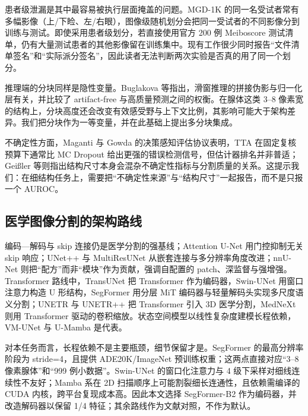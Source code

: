 患者级泄漏是其中最容易被执行层面掩盖的问题。MGD-1K 的同一名受试者常有多幅影像（上/下睑、左/右眼），图像级随机划分会把同一受试者的不同影像分到训练与测试。即使采用患者级划分，若直接使用官方 200 例 Meiboscore 测试清单，仍有大量测试患者的其他影像留在训练集中。现有工作很少同时报告“文件清单签名”和“实际派分签名”，因此读者无法判断两次实验是否真的用了同一个划分。

推理端的分块同样是隐性变量。Buglakova 等指出，滑窗推理的拼接伪影与归一化层有关，并比较了 artifact-free 与高质量预测之间的权衡\cite{buglakova2025tiling}。在腺体这类 3--8 像素宽的结构上，分块高度还会改变有效感受野与上下文比例，其影响可能大于架构差异。我们把分块作为一等变量，并在此基础上提出多分块集成。

不确定性方面，Maganti 与 Gowda 的决策感知评估协议表明，TTA 在固定复核预算下通常比 MC Dropout 给出更强的错误检测信号，但估计器排名并非普适\cite{maganti2026uncertainty}；Geißler 等则指出结构尺寸本身会混杂不确定性指标与分割质量的关系\cite{geissler2024structure}。这提示我们：在细结构任务上，需要把“不确定性来源”与“结构尺寸”一起报告，而不是只报一个 AUROC。

\subsection{医学图像分割的架构路线}

编码—解码与 skip 连接仍是医学分割的强基线\cite{ronneberger2015unet}；Attention U-Net 用门控抑制无关 skip 响应\cite{oktay2018attention}；UNet++ 与 MultiResUNet 从嵌套连接与多分辨率角度改进\cite{zhou2018unetplusplus,ibtehaz2020multiresunet}；nnU-Net 则把“配方”而非“模块”作为贡献，强调自配置的 patch、深监督与强增强\cite{isensee2021nnunet}。Transformer 路线中，TransUNet 把 Transformer 作为编码器\cite{transunet}，Swin-UNet 用窗口注意力构造 U 形结构\cite{swinunet}，SegFormer 用分层 MiT 编码器与轻量解码头实现多尺度语义分割\cite{segformer}；UNETR 与 UNETR++ 把 Transformer 引入 3D 医学分割\cite{unetr,unetrpp}，MedNeXt 则用 Transformer 驱动的卷积缩放\cite{mednext}。状态空间模型以线性复杂度建模长程依赖，VM-UNet 与 U-Mamba 是代表\cite{vmunet,umamba}。

对本任务而言，长程依赖不是主要瓶颈，细节保留才是。SegFormer 的最高分辨率阶段为 stride=4，且提供 ADE20K/ImageNet 预训练权重；这两点直接对应“3--8 像素腺体”和“999 例小数据”。Swin-UNet 的窗口化注意力与 4 级下采样对细线连续性不友好；Mamba 系在 2D 扫描顺序上可能割裂细长连通性，且依赖需编译的 CUDA 内核，跨平台复现成本高。因此本文选择 SegFormer-B2 作为编码器，并改造解码器以保留 1/4 特征；其余路线作为文献对照，不作为默认。

